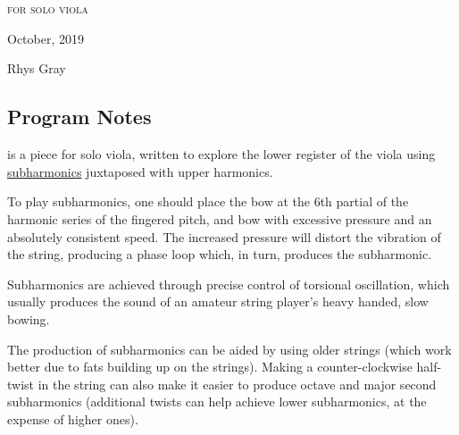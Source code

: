 
\chapter[\violaPiece]{}

\vspace*{3cm}
\begin{center}
\textsc{for solo viola}

\vspace*{3.5cm}

\HRule{0.5pt}


\LARGE \textbf{\uppercase{\violaPiece}}
\HRule{2pt}

\vspace{1.3cm}

\normalsize October, 2019
\date{}

\vspace*{5\baselineskip}

Rhys Gray

\end{center}
\newpage
\newpage

\section*{Program Notes}
\violaPiece\space is a piece for solo viola, written to explore the lower register of the viola using \hyperref[sec:subharmonics]{subharmonics} juxtaposed with upper harmonics. 

To play subharmonics, one should place the bow at the 6th partial of the harmonic series of the fingered pitch, and bow with excessive pressure and an absolutely consistent speed. 
The increased pressure will distort the vibration of the string, producing a phase loop which, in turn, produces the subharmonic. 

Subharmonics are achieved through precise control of torsional oscillation, which usually produces the sound of an amateur string player's heavy handed, slow bowing. 

The production of subharmonics can be aided by using older strings (which work better due to fats building up on the strings). 
Making a counter-clockwise half-twist in the string can also make it easier to produce octave and major second subharmonics (additional twists can help achieve lower subharmonics, at the expense of higher ones).

